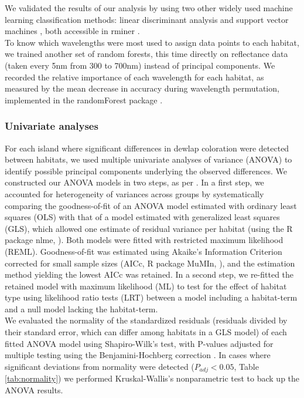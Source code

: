 We validated the results of our analysis by using two other widely used machine learning classification methods: linear discriminant analysis and support vector machines \citep{Cristianini2000, James2013}, both accessible in rminer \citep{Cortez2020}.\\

To know which wavelengths were most used to assign data points to each habitat, we trained another set of random forests, this time directly on reflectance data (taken every 5nm from 300 to 700nm) instead of principal components. We recorded the relative importance of each wavelength for each habitat, as measured by the mean decrease in accuracy during wavelength permutation, implemented in the randomForest package \citep{Liaw2002}.

\subsubsection*{Univariate analyses}

For each island where significant differences in dewlap coloration were detected between habitats, we used multiple univariate analyses of variance (ANOVA) to identify possible principal components underlying the observed differences. We constructed our ANOVA models in two steps, as per \citet{Zuur2009}. In a first step, we accounted for heterogeneity of variances across groups by systematically comparing the goodness-of-fit of an ANOVA model estimated with ordinary least squares (OLS) with that of a model estimated with generalized least squares (GLS), which allowed one estimate of residual variance per habitat (using the R package nlme, \citealt{Pinheiro2000, Pinheiro2020}). Both models were fitted with restricted maximum likelihood (REML). Goodness-of-fit was estimated using Akaike's Information Criterion corrected for small sample sizes (AICc, R package MuMIn, \citealt{Barton2019}), and the estimation method yielding the lowest AICc was retained. In a second step, we re-fitted the retained model with maximum likelihood (ML) to test for the effect of habitat type using likelihood ratio tests (LRT) between a model including a habitat-term and a null model lacking the habitat-term.\\

We evaluated the normality of the standardized residuals (residuals divided by their standard error, which can differ among habitats in a GLS model) of each fitted ANOVA model using Shapiro-Wilk's test, with P-values adjusted for multiple testing using the Benjamini-Hochberg correction \citep{Benjamini1995}. In cases where significant deviations from normality were detected ($P_{adj} < 0.05$, Table \ref{tab:normality}) we performed Kruskal-Wallis's nonparametric test to back up the ANOVA results.\\

